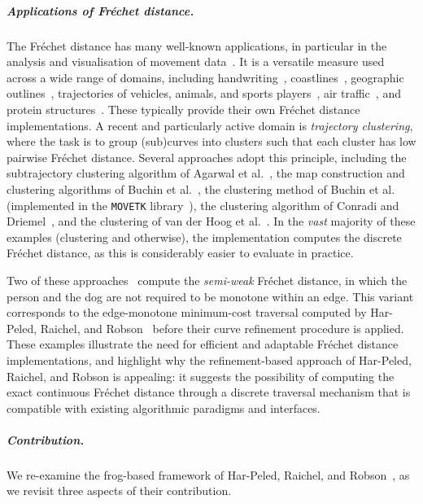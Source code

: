 \subparagraph{Applications of Fréchet distance.}
The Fréchet distance has many well-known applications, in particular in the analysis and visualisation of movement data~\cite{buchin2017clustering, buchin2020group, konzack2017visual, xie2017distributed}. 
It is a versatile measure used across a wide range of domains, including handwriting~\cite{sriraghavendra2007frechet}, coastlines~\cite{mascret2006coastline}, geographic outlines~\cite{devogele2002new}, trajectories of vehicles, animals, and sports players~\cite{acmsurvey20, su2020survey, brakatsoulas2005map, buchin2020group}, air traffic~\cite{bombelli2017strategic}, and protein structures~\cite{jiang2008protein}. 
These typically provide their own Fréchet distance implementations.
A recent and particularly active domain is \emph{trajectory clustering}, where the task is to group (sub)curves into clusters such that each cluster has low pairwise Fréchet distance. 
Several approaches adopt this principle, including the subtrajectory clustering algorithm of Agarwal et al.~\cite{agarwal2018subtrajectory}, the map construction and clustering algorithms of Buchin et al.~\cite{buchin2017clustering, buchin2020improved}, the clustering method of Buchin et al.~\cite{buchin2011detecting} (implemented in the \texttt{MOVETK} library~\cite{MOVETK}), the clustering algorithm of Conradi and Driemel~\cite{conradi2023finding}, and the clustering of van der Hoog et al.~\cite{vanderhoo2025Efficient}. 
In the \emph{vast} majority of these examples (clustering and otherwise), the implementation computes the discrete Fréchet distance, as this is considerably easier to evaluate in practice.

Two of these approaches~\cite{buchin2017clustering, buchin2020improved} compute the \emph{semi-weak} Fréchet distance, in which the person and the dog are not required to be monotone within an edge. This variant corresponds to the edge-monotone minimum-cost traversal computed by Har-Peled, Raichel, and Robson~\cite{harpeled_et_al:LIPIcs.SoCG.2025.54} before their curve refinement procedure is applied. 
These examples illustrate the need for efficient and adaptable Fréchet distance implementations, and highlight why the refinement-based approach of Har-Peled, Raichel, and Robson is appealing: it suggests the possibility of computing the exact continuous Fréchet distance through a discrete traversal mechanism that is compatible with existing algorithmic paradigms and interfaces.



\subparagraph{Contribution.}
We re-examine the frog-based framework of Har-Peled, Raichel, and Robson~\cite{harpeled_et_al:LIPIcs.SoCG.2025.54}, as we revisit three aspects of their contribution. 

